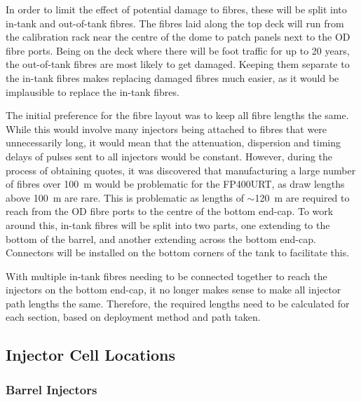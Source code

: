 \documentclass[a4paper,11pt]{article}
\let\oldsim\sim
\renewcommand{\sim}{{\oldsim}}
\begin{document}
\FloatBarrier
In order to limit the effect of potential damage to fibres, these will be split into in-tank and out-of-tank fibres. The fibres laid along the top deck will run from the calibration rack near the centre of the dome to patch panels next to the OD fibre ports. Being on the deck where there will be foot traffic for up to 20 years, the out-of-tank fibres are most likely to get damaged. Keeping them separate to the in-tank fibres makes replacing damaged fibres much easier, as it would be implausible to replace the in-tank fibres.

The initial preference for the fibre layout was to keep all fibre lengths the same. While this would involve many injectors being attached to fibres that were unnecessarily long, it would mean that the attenuation, dispersion and timing delays of pulses sent to all injectors would be constant. However, during the process of obtaining quotes, it was discovered that manufacturing a large number of fibres over 100~m would be problematic for the FP400URT, as draw lengths above 100~m are rare. This is problematic as lengths of $\sim$120~m are required to reach from the OD fibre ports to the centre of the bottom end-cap. To work around this, in-tank fibres will be split into two parts, one extending to the bottom of the barrel, and another extending across the bottom end-cap. Connectors will be installed on the bottom corners of the tank to facilitate this.

With multiple in-tank fibres needing to be connected together to reach the injectors on the bottom end-cap, it no longer makes sense to make all injector path lengths the same. Therefore, the required lengths need to be calculated for each section, based on deployment method and path taken.

\subsection{Injector Cell Locations}\label{sec:lengths:sub:inj}
\subsubsection{Barrel Injectors}\label{sec:lengths:sub:inj:sub:barrel}
\end{document}
